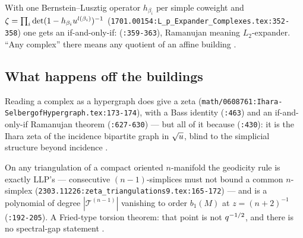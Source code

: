 \begin{citedfact}
\label{cit:kamber-lp}
\sloppy
With one Bernstein--Lusztig operator $h_{\beta_i}$ per simple coweight and %
$\zeta = \prod_i\det(1-h_{\beta_i}u^{l(\beta_i)})^{-1}$ %
(\texttt{1701.00154:L\_p\_Expander\_Complexes.tex:352-358}) one gets an
if-and-only-if:
{\small\texttt{}}
(\texttt{:359-363}), Ramanujan meaning $L_2$-expander. ``Any complex'' there
means any quotient of an affine building \cite{kamber2017lp}.
\end{citedfact}

\subsection{What happens off the buildings}

\begin{citedfact}
\label{cit:storm-reduction}
\sloppy
Reading a complex as a hypergraph does give a zeta
(\texttt{math/0608761:Ihara-SelbergofHypergraph.tex:173-174}), with a Bass
identity (\texttt{:463}) and an if-and-only-if Ramanujan theorem
(\texttt{:627-630}) --- but all of it because
{\small\texttt{\detokenize{\[ \zeta_\hyperH(u) = Z_{B_\hyperH}(\sqrt{u}).\]}}}
(\texttt{:430}): it is the Ihara zeta of the incidence bipartite graph in
$\sqrt{u}$, blind to the simplicial structure beyond incidence
\cite{storm2006hypergraph}.
\end{citedfact}

\begin{citedfact}
\label{cit:bcds-triangulation}
\sloppy
On any triangulation of a compact oriented $n$-manifold the geodicity rule is
exactly LLP's --- consecutive $(n-1)$-simplices must not bound a common
$n$-simplex (\texttt{2303.11226:zeta\_triangulations9.tex:165-172}) --- and
{\small\texttt{}}
is a polynomial of degree $|\mathcal T^{(n-1)}|$ vanishing to order $b_1(M)$ at
$z = (n+2)^{-1}$ (\texttt{:192-205}). A Fried-type torsion theorem: that point
is not $q^{-1/2}$, and there is no spectral-gap statement
\cite{benard2023combinatorial}.
\end{citedfact}

